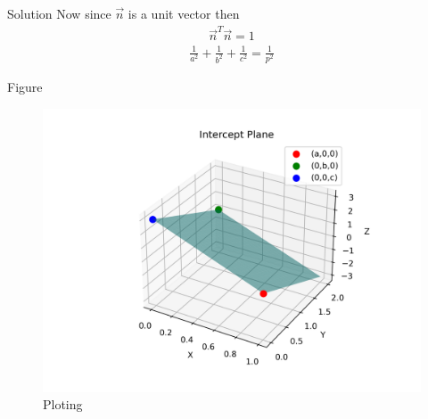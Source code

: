 \documentclass{beamer}
\begin{document}
\begin{frame}{Solution}
Now since $\Vec{n}$ is a unit vector then 
\begin{align}
    \Vec{n}^T\Vec{n}=1
\end{align}
\begin{align}
    \frac{1}{a^2}+\frac{1}{b^2}+\frac{1}{c^2}=\frac{1}{p^2}
\end{align}
    
\end{frame}
\begin{frame}{Figure}
    \begin{figure}
        \centering
        \includegraphics[width=0.5\linewidth]{figures/intercept_plane.png}
        \caption{Ploting}
        \label{fig:placeholder}
    \end{figure}
\end{frame}
\end{document}
